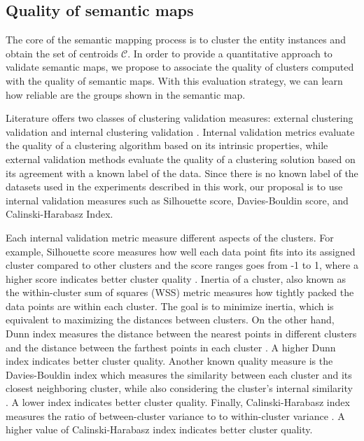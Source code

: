 \documentclass{ieeeaccess}
\begin{document}
\subsection{Quality of semantic maps}

The core of the semantic mapping process is to cluster the entity instances
and obtain the set of centroids $\mathcal{C}$. In order to provide a 
quantitative approach to validate semantic maps, we propose to associate the 
quality of clusters computed with the quality of semantic maps. With this 
evaluation strategy, we can learn how reliable are the groups shown in the 
semantic map.

Literature offers two classes of clustering validation measures: external 
clustering validation and internal clustering validation  
\cite{DBLP:books/crc/aggarwal2013}. Internal validation metrics 
evaluate the quality of a clustering algorithm based on its intrinsic 
properties, while external validation methods evaluate the quality of a 
clustering solution based on its agreement with a known label of the data. Since there is no known label of the datasets used in the experiments
described in this work, our proposal is to use internal validation measures
such as Silhouette score, Davies-Bouldin score, and Calinski-Harabasz Index.

Each internal validation metric measure different aspects of the clusters. For 
example, Silhouette score measures how well each data point fits into its 
assigned cluster compared to other clusters and the score ranges goes from -1 
to 1, where a higher score indicates better cluster quality 
\cite{kaufmanPAM}. Inertia of a cluster, also known as the within-cluster sum
of squares (WSS) metric measures how tightly packed the data points are 
within each cluster. The goal is to minimize inertia, which is equivalent to 
maximizing the distances between clusters. On the other 
hand, Dunn index measures the distance between the nearest points in 
different clusters and the distance between the farthest points in each 
cluster \cite{dunn1974well}. A higher Dunn index indicates better cluster 
quality. Another known quality measure is the Davies-Bouldin index which 
measures the similarity between each cluster and its closest neighboring 
cluster, while also considering the cluster's internal
similarity \cite{davies1979cluster}. A lower index indicates better cluster 
quality. Finally, Calinski-Harabasz index measures the ratio of between-cluster
variance to to within-cluster variance \cite{calinski1974dendrite}. A higher 
value of Calinski-Harabasz index indicates better cluster quality. 
\end{document}
